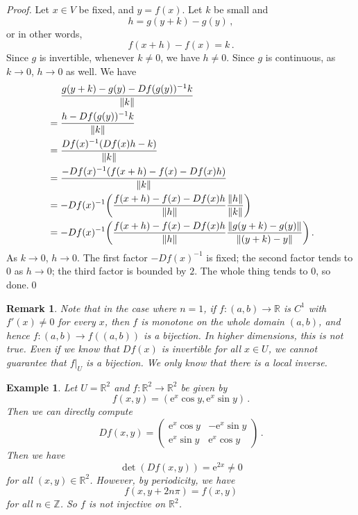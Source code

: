 \documentclass{article}
\theoremstyle{plain}\theoremheaderfont{\normalfont\itshape}\theorembodyfont{\rmfamily}\theoremseparator{.}\newtheorem*{rem}{Remark}\newtheorem*{ex}{Example}\newtheorem*{proof}{Proof}\newtheorem*{altp}{Alternative proof}
\theoremstyle{plain}\theoremheaderfont{\normalfont\bfseries}\theorembodyfont{\rmfamily}\theoremseparator{.}\newtheorem{thm}{Theorem}[section]\newtheorem{lem}[thm]{Lemma}\newtheorem{prop}[thm]{Proposition}\newtheorem*{cor}{Corollary}\newtheorem{defn}[thm]{Definition}\newtheorem{clm}[thm]{Claim}\newtheorem{clminproof}{Claim}
\theoremstyle{break}\theoremheaderfont{\normalfont\itshape}\theorembodyfont{\rmfamily}\theoremseparator{.\medskip}\newtheorem*{proofskip}{Proof}\newtheorem*{exs}{Examples}\newtheorem*{rems}{Remarks}
\theoremstyle{break}\theoremheaderfont{\normalfont\bfseries}\theorembodyfont{\rmfamily}\theoremseparator{.\medskip}\newtheorem{lemskip}[thm]{Lemma}\newtheorem{defnskip}[thm]{Definition}\newtheorem{propskip}[thm]{Proposition}\newtheorem{thmskip}[thm]{Theorem}
\newcommand{\qed}{\hfill\ensuremath{\Box}}
\newcommand{\ee}{\mathrm{e}}
\begin{document}
\begin{proof}
        Let \(x\in V\) be fixed, and \(y=f(x)\). Let \(k\) be small and
        \[h=g(y+k)-g(y)\,,\]
        or in other words,
        \[f(x+h)-f(x)=k\,.\]
        Since \(g\) is invertible, whenever \(k\ne 0\), we have \(h\ne 0\). Since \(g\) is continuous, as \(k\to 0\), \(h\to 0\) as well. We have
        \begin{align*}
            &\quad\,\,\frac{g(y+k)-g(y)-Df(g(y))^{-1}k}{\norm{k}}\\
            &=\frac{h-Df(g(y))^{-1}k}{\norm{k}}\\
            &=\frac{Df(x)^{-1}(Df(x)h-k)}{\norm{k}}\\
            &=\frac{-Df(x)^{-1}(f(x+h)-f(x)-Df(x)h)}{\norm{k}}\\
            &=-Df(x)^{-1}\qty(\frac{f(x+h)-f(x)-Df(x)h}{\norm{h}}\frac{\norm{h}}{\norm{k}})\\
            &=-Df(x)^{-1}\qty(\frac{f(x+h)-f(x)-Df(x)h}{\norm{h}}\frac{\norm{g(y+k)-g(y)}}{\norm{(y+k)-y}})\,.
        \end{align*}
        As \(k\to 0\), \(h\to 0\). The first factor \(-Df(x)^{-1}\) is fixed; the second factor tends to \(0\) as \(h\to 0\); the third factor is bounded by \(2\). The whole thing tends to \(0\), so done.\qed
    \end{proof}

    \begin{rem}
        Note that in the case where \(n=1\), if \(f:(a,b)\to\mathbb{R}\) is \(C^1\) with \(f'(x)\ne 0\) for every \(x\), then \(f\) is monotone on the whole domain \((a,b)\), and hence \(f:(a,b)\to f((a,b))\) is a bijection. In higher dimensions, this is not true. Even if we know that \(Df(x)\) is invertible for all \(x\in U\), we cannot guarantee that \(f|_U\) is a bijection. We only know that there is a local inverse.
    \end{rem}
    \begin{ex}
        Let \(U=\mathbb{R}^2\) and \(f:\mathbb{R}^2\to\mathbb{R}^2\) be given by
        \[f(x,y)=(\ee^x\cos y,\ee^x\sin y)\,.\]
        Then we can directly compute
        \[Df(x,y)=\begin{pmatrix}
            \ee^x\cos y & -\ee^x\sin y\\
            \ee^x\sin y & \ee^x\cos y
        \end{pmatrix}\,.\]
        Then we have
        \[\det(Df(x,y))=\ee^{2x}\ne 0\]
        for all \((x,y)\in\mathbb{R}^2\). However, by periodicity, we have
        \[f(x,y+2n\pi)=f(x,y)\]
        for all \(n\in\mathbb{Z}\). So \(f\) is not injective on \(\mathbb{R}^2\).
    \end{ex}
\end{document}
